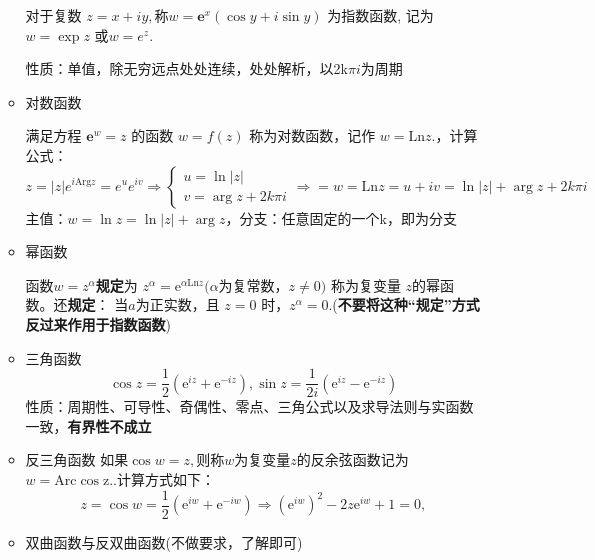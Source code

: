 \documentclass[a4paper,11pt,UTF8]{article}
\begin{document}
\begin{enumerate}
\begin{itemize}
		对于复数 $z= x+ iy, $称$w= \mathbf{e} ^x( \cos y+ i\sin y) $ 为指数函数, 记为$w=\exp z$ 或$w={e}^{z}.$
		
		性质：单值，除无穷远点处处连续，处处解析，以2k$\pi i$为周期
		\item 对数函数
		
		满足方程 $\mathbf{e}^w=z$ 的函数 $w=f(z)$ 称为对数函数，记作 $w=\mathrm{Ln}z.$，计算公式：
		$$
			z=|z|{e}^{i\mathrm{Arg}z}=e^ue^{iv}\Rightarrow\begin{cases}
				u=\ln |z|\\
				v=\arg z+2k\pi i
			\end{cases}\Rightarrow=w=\mathrm{Ln}z=u+iv=\ln |z|+\arg z+2k\pi i
		$$
		主值：$w=\ln z= \ln |z|+\arg z$，分支：任意固定的一个k，即为分支
		\item 幂函数
		
		函数$w=z^\alpha$\textbf{规定}为 $z^\alpha=\mathrm{e}^{\alpha\mathrm{Ln}z}(\alpha$为复常数，$z\neq0)$ 称为复变量 $z$的幂函数。还\textbf{规定}： 当$a$为正实数，且 $z=0$ 时，$z^{\alpha}=0.$(\textbf{不要将这种“规定”方式反过来作用于指数函数})
		
		\item 三角函数
		$$\cos z=\frac12(\mathrm{e}^{iz}+\mathrm{e}^{-iz}),\sin z=\frac1{2i}(\mathrm{e}^{iz}-\mathrm{e}^{-iz})$$
		性质：周期性、可导性、奇偶性、零点、三角公式以及求导法则与实函数一致，\textbf{有界性不成立}
		\item 反三角函数
		如果$\cos w= z, $则称$w$为复变量$z$的反余弦函数记为$w=\mathrm{Arc\cos z}.$.计算方式如下：
		$$z=\cos w=\frac12(\mathrm{e}^{iw}+\mathrm{e}^{-iw})\Rightarrow(\mathrm{e}^{iw})^2-2z\mathrm{e}^{iw}+1=0,$$
		\item 双曲函数与反双曲函数(不做要求，了解即可)
	\end{itemize}	
\end{enumerate}
\end{document}
